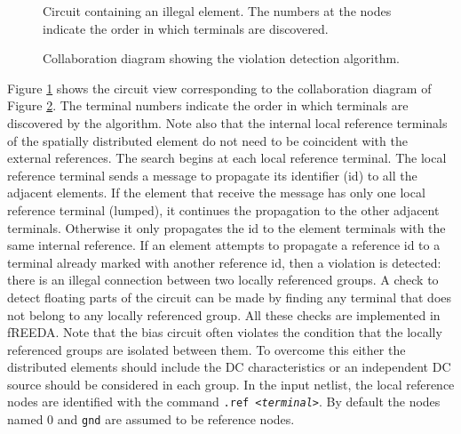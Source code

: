 %
\begin{figure}[htpb]
\centerline{\epsfxsize=2.5in }
\caption{Circuit containing an illegal element. The numbers at the
nodes indicate the order in which terminals are discovered.}
\label{fig:circuit_view}
\end{figure}
%
%
\begin{figure}[htpb]
\centerline{\epsfxsize=3in }
\caption{Collaboration diagram showing the violation detection
algorithm.} \label{fig:collaboration_error}
\end{figure}
%
Figure \ref{fig:circuit_view} shows the circuit view corresponding to
the collaboration diagram of Figure \ref{fig:collaboration_error}. The
terminal numbers indicate the order in which terminals are discovered
by the algorithm. Note also that the internal local reference
terminals of the spatially distributed element do not need to be
coincident with the external references. The search begins at each
local reference terminal. The local reference terminal sends a message
to propagate its identifier (id) to all the adjacent elements. If the
element that receive the message has only one local reference terminal
(lumped), it continues the propagation to the other adjacent
terminals. Otherwise it only propagates the id to the element
terminals with the same internal reference. If an element attempts to
propagate a reference id to a terminal already marked with another
reference id, then a violation is detected: there is an illegal
connection between two locally referenced groups. A check to detect
floating parts of the circuit can be made by finding any terminal that
does not belong to any locally referenced group.  All these checks are
implemented in fREEDA. Note that the bias circuit often violates the
condition that the locally referenced groups are isolated between
them. To overcome this either the distributed elements should include
the DC characteristics or an independent DC source should be
considered in each group.  In the input netlist, the local reference
nodes are identified with the command {\tt.ref <{\it terminal}>}. By
default the nodes named 0 and {\tt gnd} are assumed to be reference
nodes.


